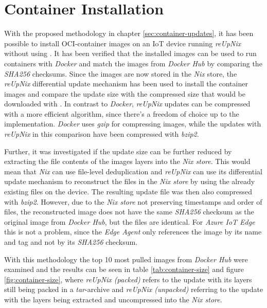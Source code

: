 \section{Container Installation}
With the proposed methodology in chapter \ref{sec:container-updates}, it has been possible
to install \ac{OCI}-container images on an \ac{IoT} device running \textit{reUpNix} without
using .
It has been verified that the installed images can be used to run containers with \textit{Docker}
and match the images from \textit{Docker Hub} by comparing the \textit{SHA256} checksums.
Since the images are now stored in the \textit{Nix} store, the \textit{reUpNix}
differential update mechanism has been used to install the container images and compare the update size
with the compressed size that would be downloaded with . In
contrast to \textit{Docker}, \textit{reUpNix} updates can be compressed with a
more efficient algorithm, since there's a freedom of choice up to the implementation.
\textit{Docker} uses \textit{gzip} for compressing images, while the updates with
\textit{reUpNix} in this comparison have been compressed with \textit{bzip2}.

Further, it was investigated if the update size can be further reduced by extracting
the file contents of the images layers into the \textit{Nix store}. This would mean
that \textit{Nix} can use file-level deduplication and \textit{reUpNix} can use
its differential update mechanism to reconstruct the files in the \textit{Nix store}
by using the already existing files on the device. The resulting update file was
then also compressed with \textit{bzip2}. However, due to the \textit{Nix store}
not preserving timestamps and order of files,
the reconstructed image does not have the same \textit{SHA256} checksum as the
original image from \textit{Docker Hub}, but the files are identical. For
\textit{Azure IoT Edge} this is not a problem, since the \textit{Edge Agent} only
references the image by its name and tag and not by its \textit{SHA256} checksum.


With this methodology the top 10 most pulled images from \textit{Docker Hub}
were examined and the results can be seen in table \ref{tab:container-size} and figure
\ref{fig:container-size}, where \textit{reUpNix (packed)} refers to the update
with its layers still being packed in a \textit{tar}-archive and \textit{reUpNix (unpacked)}
referring to the update with the layers being extracted and uncompressed into the
\textit{Nix store}.
\clearpage

